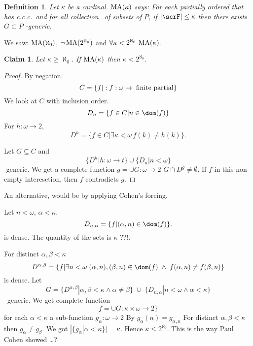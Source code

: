 \documentclass[11pt,pdftex,twoside,a4paper]{article}
\newcommand{\MA}{\ensuremath{\mathop{\rm MA}\nolimits}}
\newcommand{\ccc}{c.c.c.}
\newtheorem{ldef}[thm]{Definition}
\newtheorem{claim}[thm]{Claim}
\begin{document}
\begin{ldef}
Let \(\kappa\) be a cardinal.
\(\MA(\kappa)\) says: For each partially ordered  that 
has \ccc\ and for all collection \scrF\ of subsets of $P$,
if \(|\scrF| \leq \kappa\) then there exists \(G\subset P\) \scrF-generic.
\end{ldef}
We saw: \(\MA(\aleph_0)\), \(\lnot\MA(2^{\aleph_0})\) and 
\(\forall \kappa < 2^{\aleph_0}\, \MA(\kappa)\).

\begin{claim}
Let \(\kappa \geq \aleph_0\). If \(\MA(\kappa)\) then \(\kappa < 2^{\aleph_0}\).
\end{claim}
\begin{proof}
By negation.
\begin{equation*}
C = \{f|: f: \omega \to \;\textnormal{finite partial}\}
\end{equation*}
We look at $C$ with inclusion order.
\begin{equation*}
D_n = \{f\in C| n \in \dom(f)\}
\end{equation*}
For \(h:\omega\to 2\),
\begin{equation*}
D^h = \{f\in C | \exists \kappa < \omega\, f(k)\neq h(k)\}.
\end{equation*}

Let \(G\subseteq C\) and 
\begin{equation*}
\{D^h | h:\omega\to t\} \cup \{D_n | n < \omega\}
\end{equation*}
-generic. We get a complete function \(g = \cup G:\omega \to 2\)
\(G \cap D^g\neq \emptyset\). 
If $f$ in this non-empty interesction, then $f$ contradicts $g$.
\end{proof}

An alternative, would be by applying Cohen's forcing.

Let \(n<\omega\), \(\alpha < \kappa\).
\begin{equation*}
D_{n,\alpha} = \{f | (\alpha,n)\in \dom(f)\}.
\end{equation*}
is dense. The quantity of the sets is \(\kappa\) ??!.

For distinct \(\alpha,\beta < \kappa\)
\begin{equation*}
D^{\alpha,\beta} = \{f | \exists n < \omega\; (\alpha,n),(\beta,n)\in \dom(f)
\;\land\; f(\alpha,n) \neq f(\beta,n)\}
\end{equation*}
is dense. Let
\begin{equation*}
G = \{D^{\alpha,\beta}| \alpha,\beta<\kappa\land \alpha\neq\beta\}
\;\cup\; \{D_{n,\alpha} | n < \omega \land \alpha < \kappa\}
\end{equation*}
--generic. We get complete function
\begin{equation*}
f = \cup G: \kappa\times\omega \to 2\}
\end{equation*}
for each \(\alpha<\kappa\) a sub-function \(g_\alpha : \omega \to 2\)
By \(g_\alpha(n) = g_{\alpha,n}\)
For distinct \(\alpha,\beta <\kappa\) then \(g_\alpha \neq g_\beta\).
We got \(|\{g_\alpha | \alpha < \kappa\}|= \kappa\).
Hence \(\kappa \leq 2^{\aleph_0}\).
This is the way Paul Cohen showed \ldots ?
\end{document}
